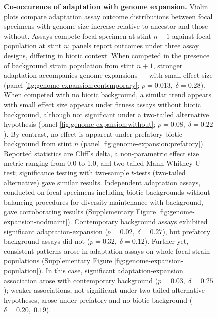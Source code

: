 \begin{figure}
\caption{
    \textbf{Co-occurence of adaptation with genome expansion.}
    \footnotesize
    Violin plots compare adaptation assay outcome distributions between focal specimens with genome size increase relative to ancestor and those without.
    Assays compete focal specimen at stint $n+1$ against focal population at stint $n$;
    panels report outcomes under three assay designs, differing in biotic context.
    When competed in the presence of background strain population from stint $n+1$, stronger adaptation accompanies genome expansions --- with small effect size (panel \ref{fig:genome-expansion:contemporary}; $p = 0.013, \; \delta = 0.28$).
    When competed with no biotic background, a similar trend appears with small effect size appears under fitness assays without biotic background, although not significant under a two-tailed alternative hypothesis (panel \ref{fig:genome-expansion:without}; $p=0.08, \; \delta = 0.22$).
    By contrast, no effect is apparent under prefatory biotic background from stint $n$ (panel \ref{fig:genome-expansion:prefatory}).
    Reported statistics are Cliff's delta, a non-parametric effect size metric ranging from 0.0 to 1.0, and two-tailed Mann-Whitney U test; significance testing with two-sample $t$-tests (two-tailed alternative) gave similar results.
    Independent adaptation assays, conducted on focal specimens including biotic backgrounds without balancing procedures for diversity maintenance with background, gave corroborating results (Supplementary Figure \ref{fig:genome-expansion-nodmaint}).
    Contemporary background assays exhibited significant adaptation-expansion  ($p=0.02, \; \delta=0.27$), but prefatory background assays did not ($p=0.32, \; \delta=0.12$).
    Further yet, consistent patterns arose in adaptation assays on whole focal strain populations (Supplementary Figure \ref{fig:genome-expansion-population}).
    In this case, significant adaptation-expansion association arose with contemporary background ($p=0.03, \; \delta=0.25$);
    weaker associations, not significant under two-tailed alternative hypotheses, arose under prefatory and no biotic background ($\delta=0.20,\; 0.19$).
}
\label{fig:genome-expansion}

\end{figure}

